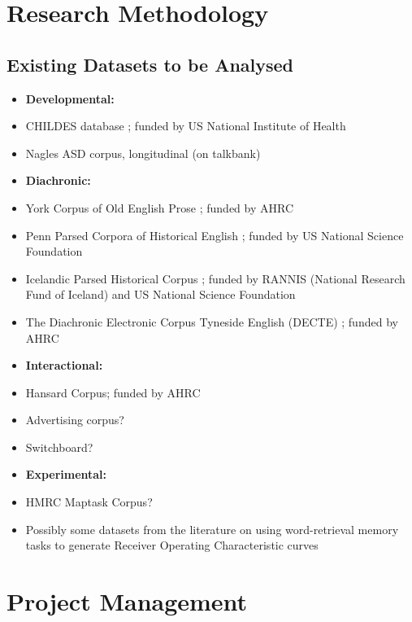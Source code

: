 \documentclass[11pt]{article}
\begin{document}
\section{Research Methodology}
\subsection{Existing Datasets to be Analysed}
\begin{itemize}
	\item[] \textbf{Developmental:}
	\item CHILDES database \citep{macwhinney1996,macwhinney2014}; funded by US National Institute of Health
	\item Nagles ASD corpus, longitudinal (on talkbank)
	\item[] \textbf{Diachronic:}
	\item York Corpus of Old English Prose \citep{ycoe}; funded by AHRC
	\item Penn Parsed Corpora of Historical English \citep{ppcme24, ppceme, ppcmbe2}; funded by US National Science Foundation
	\item Icelandic Parsed Historical Corpus \citep{icepahc09}; funded by RANNIS (National Research Fund of Iceland) and US National Science Foundation
	\item The Diachronic Electronic Corpus Tyneside English (DECTE) \cite{decte}; funded by AHRC
	\item[] \textbf{Interactional:}
	\item Hansard Corpus; funded by AHRC
	\item Advertising corpus?
	\item Switchboard?
	\item[] \textbf{Experimental:}
	\item HMRC Maptask Corpus?
	\item Possibly some datasets from the literature on using word-retrieval memory tasks to generate Receiver Operating Characteristic curves
\end{itemize}

\section{Project Management}
\end{document}
